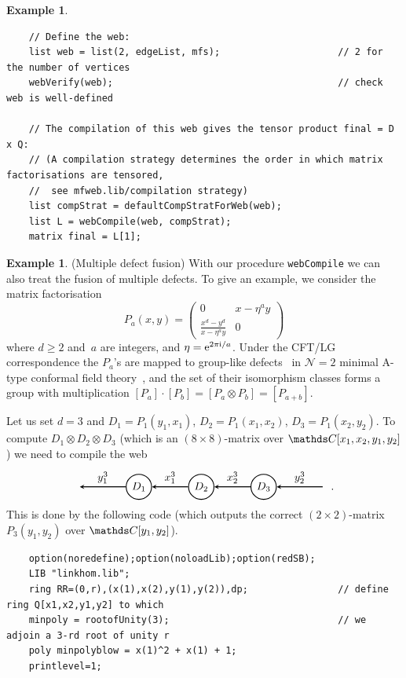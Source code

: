 \documentclass{compositio}
\theoremstyle{definition}
\newtheorem{example}[theorem]{Example}
\numberwithin{equation}{section}
\begin{document}
\begin{example}
{\begin{verbatim}
    // Define the web:
    list web = list(2, edgeList, mfs);                     // 2 for the number of vertices
    webVerify(web);                                        // check web is well-defined
    
    // The compilation of this web gives the tensor product final = D x Q:
    // (A compilation strategy determines the order in which matrix factorisations are tensored, 
    //  see mfweb.lib/compilation strategy)
    list compStrat = defaultCompStratForWeb(web);
    list L = webCompile(web, compStrat);
    matrix final = L[1];
\end{verbatim}
}
\end{example}


\begin{example}(Multiple defect fusion)
With our procedure \texttt{webCompile} we can also treat the fusion of multiple defects. To give an example, we consider the matrix factorisation
$$
P_{a}(x,y)=\begin{pmatrix} 0 & x-\eta^{a} y \\ \frac{x^d-y^d}{x-\eta^{a} y} & 0\end{pmatrix}
$$
where $d\geqslant 2$ and~$a$ are integers, and $\eta=\operatorname{e}\!^{2\pi\!\operatorname{i}\!/a}$. Under the CFT/LG correspondence the $P_{a}$'s are mapped to group-like defects~\cite{ffrs0607247} in $\mathcal N=2$ minimal A-type conformal field theory~\cite{br0707.0922, cr0909.4381}, and the set of their isomorphism classes forms a group with multiplication $[P_{a}]\cdot[P_{b}] = [P_{a}\otimes P_{b}] = [P_{a+b}]$. 

Let us set $d=3$ and $D_{1}=P_{1}(y_{1},x_{1})$, $D_{2}=P_{1}(x_{1},x_{2})$, $D_{3}=P_{1}(x_{2},y_{2})$. To compute $D_{1}\otimes D_{2}\otimes D_{3}$ (which is an $(8\times 8)$-matrix over $\nC[x_{1},x_{2},y_{1},y_{2}]$) we need to compile the web
$$
\begin{tikzpicture}[scale=1.0,baseline=-0.1cm, inner sep=1mm, >=stealth]
\node (b) at (-2,0)  {};
\node (D1) at (0,0) [circle,draw=black,fill= white, thick] {$D_{1}$};
\node (D2) at (2,0) [circle,draw=black,fill= white, thick] {$D_{2}$};
\node (D3) at (4,0) [circle,draw=black,fill= white, thick] {$D_{3}$};
\node (b2) at (6,0)  {};
\draw[->,  thick] (D1) -- (b) node[midway,above] {$y_{1}^3$}; 
\draw[->,  thick] (D2) -- (D1) node[midway,above] {$x_{1}^3$}; 
\draw[->,  thick] (D3) -- (D2) node[midway,above] {$x_{2}^3$}; 
\draw[->,  thick] (b2) -- (D3) node[midway,above] {$y_{2}^3$}; 
\end{tikzpicture} \, .
$$
This is done by the following code (which outputs the correct $(2\times 2)$-matrix $P_{3}(y_{1},y_{2})$ over $\nC[y_{1},y_{2}]$). 
{\footnotesize
\begin{verbatim}
    option(noredefine);option(noloadLib);option(redSB);
    LIB "linkhom.lib";
    ring RR=(0,r),(x(1),x(2),y(1),y(2)),dp;                // define ring Q[x1,x2,y1,y2] to which
    minpoly = rootofUnity(3);                              // we adjoin a 3-rd root of unity r
    poly minpolyblow = x(1)^2 + x(1) + 1;
    printlevel=1;
    

\end{verbatim}}
\end{example}
\end{document}
